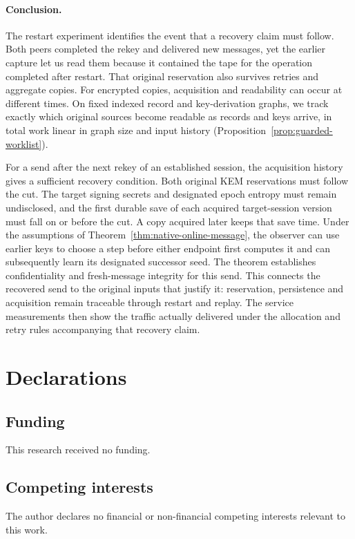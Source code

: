 \documentclass[pdflatex]{sn-jnl}
\theoremstyle{thmstyleone}
\theoremstyle{thmstylethree}
\theoremstyle{thmstyletwo}
\begin{document}
\paragraph{Conclusion.}
The restart experiment identifies the event that a recovery claim must
follow. Both peers completed the rekey and delivered new messages, yet
the earlier capture let us read them because it contained the tape for
the operation completed after restart. That original reservation also
survives retries and aggregate copies. For encrypted copies, acquisition
and readability can occur at different times. On fixed indexed record
and key-derivation graphs, we track exactly which original sources become
readable as records and keys arrive, in total work linear in graph size
and input history (Proposition~\ref{prop:guarded-worklist}).

For a send after the next rekey of an established session, the
acquisition history gives a sufficient recovery condition. Both original KEM
reservations must follow the cut. The target signing secrets and
designated epoch entropy must remain undisclosed, and the first durable
save of each acquired target-session version must fall on or before the
cut. A copy acquired later keeps that save time. Under the assumptions
of Theorem~\ref{thm:native-online-message}, the observer can use earlier
keys to choose a step before either endpoint first computes it and can
subsequently learn its designated successor seed. The theorem establishes
confidentiality and fresh-message integrity for this send.
This connects the recovered send to the original inputs that justify
it: reservation, persistence and acquisition remain traceable through
restart and replay. The service measurements then show the traffic
actually delivered under the allocation and retry rules accompanying
that recovery claim.
\section*{Declarations}

\subsection*{Funding}
This research received no funding.

\subsection*{Competing interests}
The author declares no financial or non-financial competing interests
relevant to this work.
\end{document}
